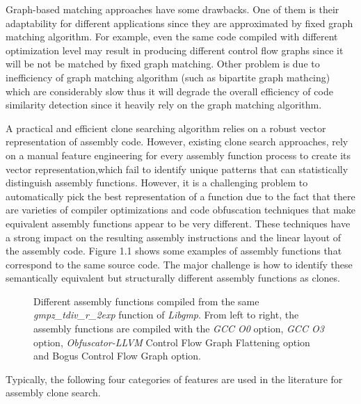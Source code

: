 
Graph-based matching approaches have some drawbacks. One of them is their adaptability for different applications since they are approximated by fixed graph matching algorithm. For example, even the same code compiled with different optimization level may result in producing different control flow graphs since it will be not be matched by fixed graph matching\cite{Xu}. Other problem is due to inefficiency of graph matching algorithm (such as bipartite graph mathcing) which are considerably slow thus it will degrade the overall efficiency of code similarity detection since it heavily rely on the graph matching algorithm.  

A practical and efficient clone searching algorithm relies on a robust vector representation of assembly code. However, existing clone search approaches, rely on a manual feature engineering for every assembly function process to create its vector representation,which fail to identify unique patterns that can statistically distinguish assembly functions. However, it is a challenging problem to automatically pick the best representation of a function due to the fact that there are varieties of compiler optimizations and code obfuscation techniques that make equivalent assembly functions appear to be very different. These techniques have a strong impact on the resulting assembly instructions and the linear layout of the assembly code. Figure 1.1 shows some examples of assembly functions that correspond to the same source code. The major challenge is how to identify these semantically equivalent but structurally different assembly functions as clones.


\begin{figure}
	\centering
	\caption{Different assembly functions compiled from the same \textit{gmpz\_tdiv\_r\_2exp} function of \textit{Libgmp}. From left to right, the assembly functions are compiled with the \textit{GCC O0} option, \textit{GCC O3} option, \textit{Obfuscator-LLVM} Control Flow Graph Flattening option and Bogus Control Flow Graph option.}
\end{figure}


Typically, the following four categories of features are used in the literature for assembly clone search.

